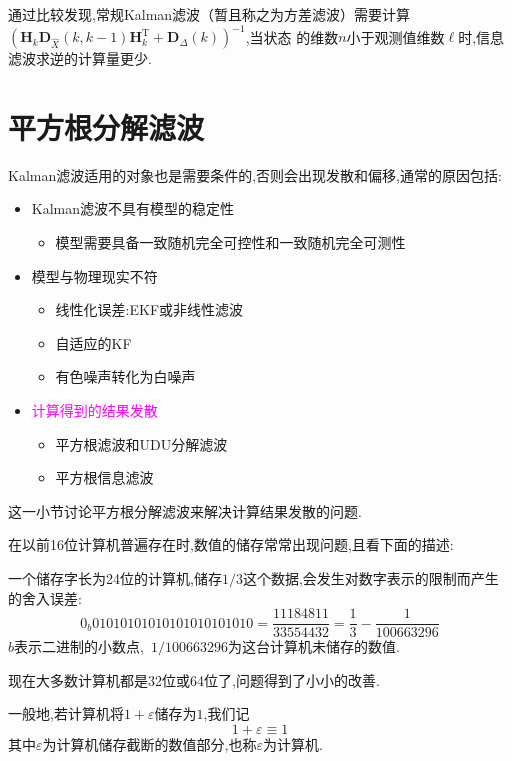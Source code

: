 \documentclass[cn,10pt,citestyle=gb7714-2015,bibstyle=gb7714-2015]{elegantbook}
\newcommand{\mT}{\mathrm{T}}
\renewcommand{\l}{\ell}
\begin{document}
通过比较发现,常规Kalman滤波（暂且称之为方差滤波）需要计算$\left(\bm{H}_k\bm{D}_{\hat{X}}(k,k-1)\bm{H}_k^\mT+\bm{D}_\varDelta(k)\right)^{-1}$,当状态
的维数$n$小于观测值维数$\l$时,信息滤波求逆的计算量更少.
\section{平方根分解滤波}
Kalman滤波适用的对象也是需要条件的,否则会出现发散和偏移,通常的原因包括:
\begin{itemize}
  \item Kalman滤波不具有模型的稳定性
  \begin{itemize}
    \item 模型需要具备一致随机完全可控性和一致随机完全可测性
  \end{itemize}
  \item 模型与物理现实不符
  \begin{itemize}
    \item 线性化误差:EKF或非线性滤波
    \item 自适应的KF
    \item 有色噪声转化为白噪声
  \end{itemize}
  \item \textcolor{magenta}{计算得到的结果发散}
  \begin{itemize}
    \item 平方根滤波和UDU分解滤波
    \item 平方根信息滤波
  \end{itemize}
\end{itemize}
这一小节讨论平方根分解滤波来解决计算结果发散的问题.

在以前16位计算机普遍存在时,数值的储存常常出现问题,且看下面的描述:
\begin{example}
  一个储存字长为24位的计算机,储存$1/3$这个数据,会发生对数字表示的限制而产生的\colorbox{yellow!20}{舍入误差}:
  \[
    0_b01010101010101010101010=\frac{11184811}{33554432}=\frac{1}{3}-\frac{1}{100663296}
  \]
  $b$表示二进制的小数点,\ $1/100663296$为这台计算机未储存的数值.
\end{example}
现在大多数计算机都是32位或64位了,问题得到了小小的改善.
\begin{note}
  一般地,若计算机将$1+\varepsilon$储存为$1$,我们记
\begin{equation}
  1+\varepsilon\equiv 1
\end{equation}
其中$\varepsilon$为计算机储存截断的数值部分,也称$\varepsilon$为计算机.
\end{note}
\end{document}
